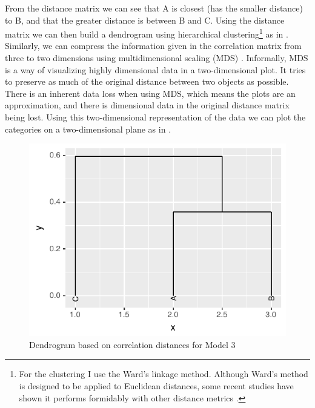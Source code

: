 From the distance matrix we can see that A is closest (has the smaller distance) to B, and that the greater distance is between B and C. Using the distance matrix we can then build a dendrogram using hierarchical clustering\footnote{For the clustering I use the Ward's linkage method. Although Ward's method \autocite{Murtagh.2014} is designed to be applied to Euclidean distances, some recent studies have shown it performs formidably with other distance metrics \autocites{Meyniel.2010, Strauss.2017}.} \autocite{Rokach.2005} as in . Similarly, we can compress the information given in the correlation matrix from three to two dimensions using multidimensional scaling (MDS) \autocite{Borg.2005, Cysouw.2007c}. Informally, MDS is a way of visualizing highly dimensional data in a two-dimensional plot. It tries to preserve as much of the original distance between two objects as possible. There is an inherent data loss when using MDS, which means the plots are an approximation, and there is dimensional data in the original distance matrix being lost. Using this two-dimensional representation of the data we can plot the categories on a two-dimensional plane as in .

\begin{figure}%
  \centering
  \includegraphics{./figures/fake/dendro3.pdf}
  \caption{Dendrogram based on correlation distances for Model 3}\label{fig:dendro-model3}
\end{figure}

